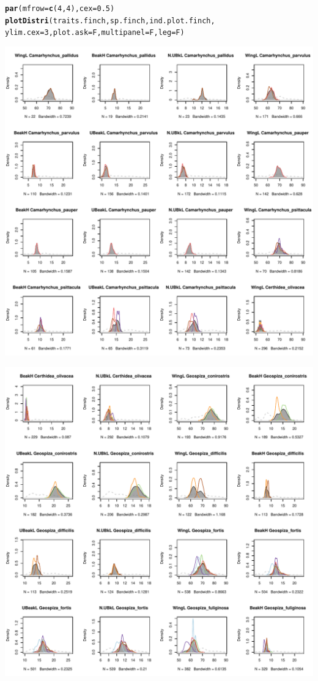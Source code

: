\documentclass[12pt]{article}\usepackage[]{graphicx}\usepackage[]{color}
\makeatletter
\def\maxwidth{ %
  \ifdim\Gin@nat@width>\linewidth
    \linewidth
  \else
    \Gin@nat@width
  \fi
}
\newcommand{\hlnum}[1]{\textcolor[rgb]{0.686,0.059,0.569}{#1}}%
\newcommand{\hlstd}[1]{\textcolor[rgb]{0.345,0.345,0.345}{#1}}%
\newcommand{\hlkwc}[1]{\textcolor[rgb]{0.333,0.667,0.333}{#1}}%
\newcommand{\hlkwd}[1]{\textcolor[rgb]{0.737,0.353,0.396}{\textbf{#1}}}%
\newenvironment{kframe}{%
 \def\at@end@of@kframe{}%
 \ifinner\ifhmode%
  \def\at@end@of@kframe{\end{minipage}}%
  \begin{minipage}{\columnwidth}%
 \fi\fi%
 \def\FrameCommand##1{\hskip\@totalleftmargin \hskip-\fboxsep
 \colorbox{shadecolor}{##1}\hskip-\fboxsep
     \hskip-\linewidth \hskip-\@totalleftmargin \hskip\columnwidth}%
 \MakeFramed {\advance\hsize-\width
   \@totalleftmargin\z@ \linewidth\hsize
   \@setminipage}}%
 {\par\unskip\endMakeFramed%
 \at@end@of@kframe}
\newenvironment{knitrout}{}{} %
\makeatother
\begin{document}
\begin{knitrout}
\color{fgcolor}\begin{kframe}
\begin{alltt}
\hlkwd{par}\hlstd{(}\hlkwc{mfrow} \hlstd{=} \hlkwd{c}\hlstd{(}\hlnum{4}\hlstd{,}\hlnum{4}\hlstd{),} \hlkwc{cex} \hlstd{=} \hlnum{0.5}\hlstd{)}
\hlkwd{plotDistri}\hlstd{(traits.finch, sp.finch, ind.plot.finch,}
     \hlkwc{ylim.cex} \hlstd{=} \hlnum{3}\hlstd{,} \hlkwc{plot.ask} \hlstd{= F,} \hlkwc{multipanel} \hlstd{= F,} \hlkwc{leg} \hlstd{= F)}
\end{alltt}
\end{kframe}
\includegraphics[width=\maxwidth]{figure/unnamed-chunk-101} 

\includegraphics[width=\maxwidth]{figure/unnamed-chunk-102} 


\end{knitrout}
\end{document}
